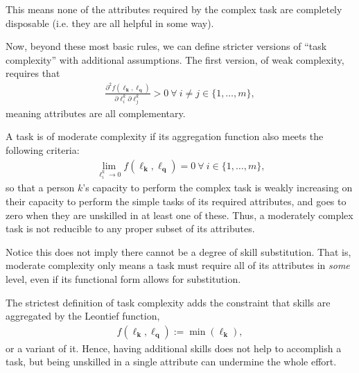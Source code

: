 \documentclass[hidelinks, nonatbib]{elsarticle}
\begin{document}
\begin{definition}
    This means none of the attributes required by the complex task are completely disposable (i.e. they are all helpful in some way).
    
    \begin{subdefinition}
        Now, beyond these most basic rules, we can define stricter versions of ``task complexity'' with additional assumptions. The first version, of weak complexity, requires that
        \begin{gather}
            \frac{
                \partial ^ 2 {
                    f(\boldsymbol{\ell_k}, \boldsymbol{\ell_q})
                }
            }{
                \partial 
                \ell_{i}^{k}
                \partial
                \ell_{j}^{k}
            }
            > 0
            \
            \forall
            \
            i \neq j \in \{1, \dots, m\}
            ,
        \end{gather}
        meaning attributes are all complementary.
    \end{subdefinition}
    
    \begin{subdefinition}
        A task is of moderate complexity if its aggregation function also meets the following criteria:
        \begin{gather}
            \lim_{
                \ell_{i}^{k}
                \rightarrow 0
            }{
                f(\boldsymbol{\ell_k}, \boldsymbol{\ell_q})
            }
            = 0
            \
            \forall 
            \
            i \in \{1, \dots, m\}
            ,
        \end{gather}
        so that a person $k$'s capacity to perform the complex task is weakly increasing on their capacity to perform the simple tasks of its required attributes, and goes to zero when they are unskilled in at least one of these. Thus, a moderately complex task is not reducible to any proper subset of its attributes.
        
        Notice this does not imply there cannot be a degree of skill substitution. That is, moderate complexity only means a task must require all of its attributes in \textit{some} level, even if its functional form allows for substitution.
    \end{subdefinition}
    
    \begin{subdefinition}[Strong Complexity]
        The strictest definition of task complexity adds the constraint that skills are aggregated by the Leontief function,
        \begin{gather}
            f(\boldsymbol{\ell_k}, \boldsymbol{\ell_q})
            :=
            \min(\boldsymbol{\ell_k})
            ,
        \end{gather}
        or a variant of it. Hence, having additional skills does not help to accomplish a task, but being unskilled in a single attribute can undermine the whole effort.
    \end{subdefinition}

\end{definition}
\end{document}
